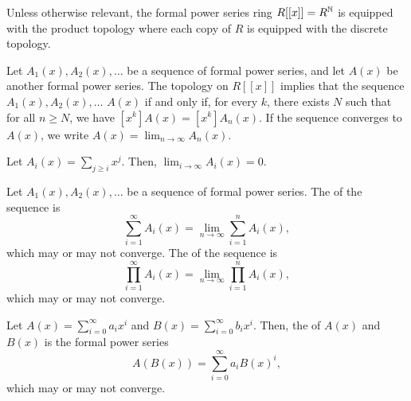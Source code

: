 Unless otherwise relevant, the formal power series ring \(R[[x]] = R^{\mathbb{N}}\) is equipped with the product topology where each copy of \(R\) is equipped with the discrete topology.

Let \(A_1(x), A_2(x), \dots\) be a sequence of formal power series,
and let \(A(x)\) be another formal power series.
The topology on \(R[[x]]\) implies that
the sequence \(A_1(x), A_2(x), \dots\)  \(A(x)\)
if and only if,
for every \(k\),
there exists \(N\) such that
for all \(n \geq N\),
we have \([x^k] A(x) = [x^k] A_n(x)\).
If the sequence converges to \(A(x)\),
we write \(A(x) = \lim_{n \to \infty} A_n(x)\).

\begin{example}
    Let \(A_i(x) = \sum_{j \geq i} x^j\).
    Then, \(\lim_{i \to \infty} A_i(x) = 0\).
\end{example}

Let \(A_1(x), A_2(x), \dots\) be a sequence of formal power series.
The  of the sequence is
\[
    \sum_{i=1}^\infty A_i(x) = \lim_{n \to \infty} \sum_{i=1}^n A_i(x),
\]
which may or may not converge.
The  of the sequence is
\[
    \prod_{i=1}^\infty A_i(x) = \lim_{n \to \infty} \prod_{i=1}^n A_i(x),
\]
which may or may not converge.

Let \(A(x) = \sum_{i=0}^\infty a_i x^i\) and \(B(x) = \sum_{i=0}^\infty b_i x^i\).
Then, the  of \(A(x)\) and \(B(x)\) is the formal power series
\[
    A(B(x)) = \sum_{i=0}^\infty a_i B(x)^i,
\]
which may or may not converge.